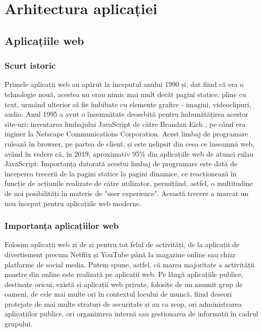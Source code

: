 \chapter{Arhitectura aplicației}

\section{Aplicațiile web}

\subsection{Scurt istoric}

Primele aplicații web au apărut la începutul anului 1990 \cite{history_of_js} și, dat fiind că era o tehnologie nouă, acestea nu erau nimic mai mult decât pagini statice, pline cu text, urmând ulterior să fie îmbibate cu elemente grafice - imagini, videoclipuri, audio. Anul 1995 a avut o însemnătate deosebită pentru îmbunătățirea acestor site-uri: inventarea limbajului JavaScript de către Brandan Eich \cite{brandan_eich_js}, pe când era inginer la Netscape Communications Corporation. Acest limbaj de programare rulează în browser, pe partea de client, și este nelipsit din ceea ce înseamnă web, având în vedere că, în 2019, aproximativ 95\% \cite{popularity_of_js} din aplicațiile web de atunci rulau JavaScript. Importanța datorată acestui limbaj de programare este dată de începerea trecerii de la pagini statice la pagini dinamice, ce reacționează în funcție de acțiunile realizate de către utilizator, permițând, astfel, o multitudine de noi posibilități în materie de "user experience". Această trecere a marcat un nou început pentru aplicațiile web moderne.


\subsection{Importanța aplicațiilor web}

Folosim aplicații web zi de zi pentru tot felul de activități, de la aplicații de divertisment precum Netflix și YouTube până la magazine online sau chiar platforme de social media. Putem spune, astfel, că marea majoritate a activității noastre din online este realizată pe aplicații web. Pe lângă aplicațiile publice, destinate oricui, există și aplicații web private, folosite de un anumit grup de oameni, de cele mai multe ori în contextul locului de muncă, fiind deseori protejate de mai multe straturi de securitate și au ca scop, ori administrarea aplicațiilor publice, ori organizarea internă sau gestionarea de informații în cadrul grupului.

